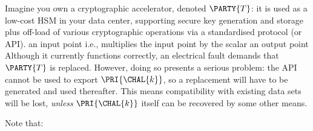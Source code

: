 %



Imagine you own a cryptographic accelerator, denoted $\PARTY{T}$: it is used
as a low-cost HSM in your data center, supporting secure key generation and 
storage plus off-load of various cryptographic operations via a standardised 
protocol (or API).
{an  input point}
{i.e., multiplies the input point by the scalar}
{an output point}
Although it currently functions correctly, an electrical fault demands that
$\PARTY{T}$ 
is replaced.  However, doing so presents a serious problem: the API cannot 
be used to export 
$\PRI{\CHAL{k}}$, 
so a replacement will have to be generated and used thereafter.  This means 
compatibility with existing data sets will be lost, {\em unless} 
$\PRI{\CHAL{k}}$ 
itself can be recovered by some other means.




%
Note that:

